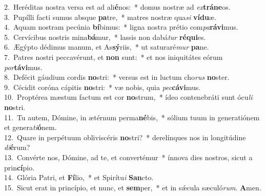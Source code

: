 {2.~}Heréditas nostra versa est ad ali\textbf{é}nos:~* domus nostræ ad \textit{ex}\textbf{trá}\textbf{ne}os.\\
{3.~}Pupílli facti sumus absque \textbf{pa}tre,~* matres nostræ qua\textit{si} \textbf{ví}\textbf{du}æ.\\
{4.~}Aquam nostram pecúnia \textbf{bí}bimus:~* ligna nostra prétio com\textit{pa}\textbf{rá}\textbf{vi}mus.\\
{5.~}Cervícibus nostris mina\textbf{bá}mur,~* lassis non dabá\textit{tur} \textbf{ré}\textbf{qui}es.\\
{6.~}Ægýpto dédimus manum, et As\textbf{sý}riis,~* ut saturaré\textit{mur} \textbf{pa}ne.\\
{7.~}Patres nostri peccavérunt, et \textbf{non} sunt:~* et nos iniquitátes eórum \textit{por}\textbf{tá}\textbf{vi}mus.\\
{8.~}Defécit gáudium cordis \textbf{no}stri:~* versus est in luctum cho\textit{rus} \textbf{no}ster.\\
{9.~}Cécidit coróna cápitis \textbf{no}stri:~* væ nobis, quia \textit{pec}\textbf{cá}\textbf{vi}mus.\\
{10.~}Proptérea mæstum factum est cor \textbf{no}strum,~* ídeo contenebráti sunt ócu\textit{li} \textbf{no}stri.\\
{11.~}Tu autem, Dómine, in ætérnum perma\textbf{né}bis,~* sólium tuum in generatiónem et genera\textit{ti}\textbf{ó}nem.\\
{12.~}Quare in perpétuum obliviscéris \textbf{no}stri?~* derelínques nos in longitúdine \textit{di}\textbf{é}rum?\\
{13.~}Convérte nos, Dómine, ad te, et convertémur~* ínnova dies nostros, sicut a prin\textbf{cí}pio.\\
{14.~}Glória Patri, et \textbf{Fí}lio,~* et Spirítu\textit{i} \textbf{San}cto.\\
{15.~}Sicut erat in princípio, et nunc, et \textbf{sem}per,~* et in sǽcula sæculó\textit{rum}. \textbf{A}men.\\
